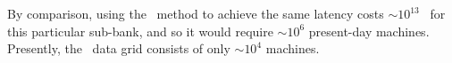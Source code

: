 By comparison, using the \TD\ method to achieve the same latency costs $\sim 10^{13}$ \flops\ for this particular sub-bank, and so it would require $\sim 10^6$ present-day machines.  Presently, the \LIGO\ data grid consists of only $\sim 10^4$ machines.

